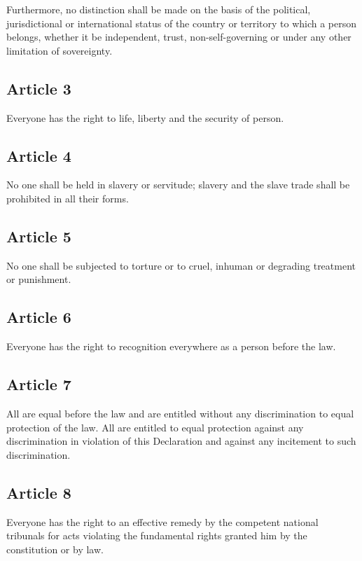 \documentclass[
  ngerman,
  american,
  titlepage,
  openright,
  DIV=calc,
  toc=listof,
  listof=nochaptergap]{scrbook}
\begin{document}
Furthermore, no distinction shall be made on the basis of the political,
jurisdictional or international status of the country or territory to
which a person belongs, whether it be independent, trust,
non-self-governing or under any other limitation of sovereignty.

\subsection{Article 3}\label{article-3-3}

Everyone has the right to life, liberty and the security of person.

\subsection{Article 4}\label{article-4-3}

No one shall be held in slavery or servitude; slavery and the slave
trade shall be prohibited in all their forms.

\subsection{Article 5}\label{article-5-3}

No one shall be subjected to torture or to cruel, inhuman or degrading
treatment or punishment.

\subsection{Article 6}\label{article-6-3}

Everyone has the right to recognition everywhere as a person before the
law.

\subsection{Article 7}\label{article-7-3}

All are equal before the law and are entitled without any discrimination
to equal protection of the law. All are entitled to equal protection
against any discrimination in violation of this Declaration and against
any incitement to such discrimination.

\subsection{Article 8}\label{article-8-3}

Everyone has the right to an effective remedy by the competent national
tribunals for acts violating the fundamental rights granted him by the
constitution or by law.
\end{document}
